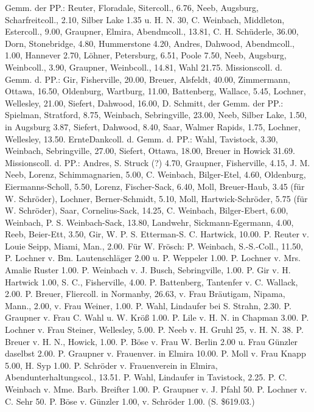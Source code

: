 Gemm. der PP.: Reuter, Floradale, Sitercoll., 6.76, Neeb, Augsburg, Scharfreitcoll., 2.10, Silber Lake 1.35 u. H. N. 30, C. Weinbach, Middleton, Estercoll., 9.00, Graupner, Elmira, Abendmcoll., 13.81, C. H. Schüderle, 36.00, Dorn, Stonebridge, 4.80, Hummerstone 4.20, Andres, Dahwood, Abendmcoll., 1.00, Hannever 2.70, Löhner, Petersburg, 6.51, Poole 7.50, Neeb, Augsburg, Weinbcoll., 3.90, Graupner, Weinbcoll., 14.81, Wahl 21.75. Missionscoll. d. Gemm. d. PP.: Gir, Fisherville, 20.00, Breuer, Alsfeldt, 40.00, Zimmermann, Ottawa, 16.50, Oldenburg, Wartburg, 11.00, Battenberg, Wallace, 5.45, Lochner, Wellesley, 21.00, Siefert, Dahwood, 16.00, D. Schmitt, der Gemm. der PP.: Spielman, Stratford, 8.75, Weinbach, Sebringville, 23.00, Neeb, Silber Lake, 1.50, in Augsburg 3.87, Siefert, Dahwood, 8.40, Saar, Walmer Rapids, 1.75, Lochner, Wellesley, 13.50. ErnteDankcoll. d. Gemm. d. PP.: Wahl, Tavistock, 3.30, Weinbach, Sebringville, 27.00, Siefert, Ottawa, 18.00, Breuer in Howick 31.69. Missionscoll. d. PP.: Andres, S. Struck (?) 4.70, Graupner, Fisherville, 4.15, J. M. Neeb, Lorenz, Schimmagnarien, 5.00, C. Weinbach, Bilger-Etel, 4.60, Oldenburg, Eiermanns-Scholl, 5.50, Lorenz, Fischer-Sack, 6.40, Moll, Breuer-Haub, 3.45 (für W. Schröder), Lochner, Berner-Schmidt, 5.10, Moll, Hartwick-Schröder, 5.75 (für W. Schröder), Saar, Cornelius-Sack, 14.25, C. Weinbach, Bilger-Ebert, 6.00, Weinbach, P. S. Weinbach-Sack, 13.80, Landwehr, Sickmann-Egermann, 4.00, Reeb, Beier-Ett, 3.50, Gir, W. P. S. Etterman-S. C. Hartwick, 10.00. P. Reuter v. Louie Seipp, Miami, Man., 2.00. Für W. Frösch: P. Weinbach, S.-S.-Coll., 11.50, P. Lochner v. Bm. Lautenschläger 2.00 u. P. Weppeler 1.00. P. Lochner v. Mrs. Amalie Ruster 1.00. P. Weinbach v. J. Busch, Sebringville, 1.00. P. Gir v. H. Hartwick 1.00, S. C., Fisherville, 4.00. P. Battenberg, Tantenfer v. C. Wallack, 2.00. P. Breuer, Fliercoll. in Normanby, 26.63, v. Frau Bräutigam, Nipama, Mann., 2.00, v. Frau Weiner,  1.00. P. Wahl, Lindaufer bei S. Strahn,  2.30. P. Graupner v. Frau C. Wahl u. W. Kröß 1.00. P. Lile v. H. N. in Chapman 3.00. P. Lochner v. Frau Steiner, Wellesley, 5.00. P. Neeb v. H. Gruhl 25, v. H. N. 38. P. Breuer v. H. N., Howick, 1.00. P. Böse v. Frau W. Berlin 2.00 u. Frau Günzler daselbst 2.00. P. Graupner v. Frauenver. in Elmira 10.00. P. Moll v. Frau Knapp 5.00, H. Syp 1.00. P. Schröder v. Frauenverein in Elmira, Abendunterhaltungscol., 13.51. P. Wahl, Lindaufer in Tavistock, 2.25. P. C. Weinbach v. Mme. Barb. Breifter 1.00. P. Graupner v. J. Pfahl 50. P. Lochner v. C. Sehr 50. P. Böse v. Günzler 1.00, v. Schröder 1.00. (S. \$619.03.)


